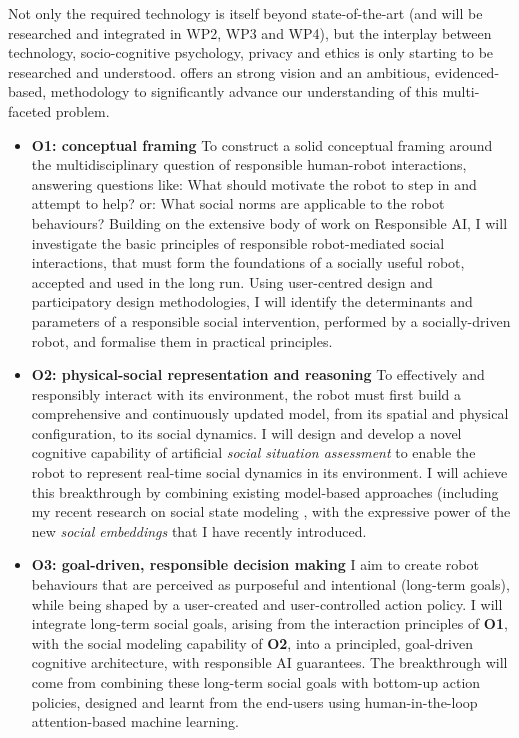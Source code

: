 Not only the required technology is itself beyond state-of-the-art (and will be
researched and integrated in WP2, WP3 and WP4), but the
interplay between technology, socio-cognitive psychology, privacy and ethics is
only starting to be researched and understood. \project offers an
strong vision and an ambitious, evidenced-based, methodology to significantly
advance our understanding of this multi-faceted problem.


\begin{itemize}
    \item \textbf{O1: conceptual framing} To construct a solid conceptual
        framing around the multidisciplinary question of responsible human-robot
        interactions, answering questions like: What should motivate the robot
        to step in and attempt to help? or: What social norms are applicable to
        the robot behaviours? Building on the extensive body of work on
        Responsible AI, I will investigate the basic principles of
        responsible robot-mediated social interactions, that must form the
        foundations of a socially useful robot, accepted and used in the long
        run.  Using user-centred design and participatory design methodologies,
        I will identify the determinants and parameters of a responsible social
        intervention, performed by a socially-driven robot, and formalise them
        in practical principles.

    \item \textbf{O2: physical-social representation and reasoning} To
        effectively and responsibly interact with its environment, the robot
        must first build a comprehensive and continuously updated model, from its
        spatial and physical configuration, to its social dynamics. I will
        design and develop a novel cognitive capability of artificial
        \emph{social situation assessment} to enable the robot to represent
        real-time social dynamics in its environment. I will achieve this
        breakthrough by combining existing model-based approaches 
        (including my recent research on social state modeling , with
        the expressive power of the new \emph{social embeddings} that I have
        recently introduced.

    \item {\bf O3: goal-driven, responsible decision making} I aim to create
        robot behaviours that are perceived as purposeful and intentional
        (long-term goals), while being shaped by a user-created and
        user-controlled action policy.  I will integrate long-term social goals,
        arising from the interaction principles of \textbf{O1}, with the social
        modeling capability of \textbf{O2}, into a principled, goal-driven
        cognitive architecture, with responsible AI guarantees. The breakthrough
        will come from combining these long-term social goals with bottom-up
        action policies, designed and learnt from the end-users using
        human-in-the-loop attention-based machine learning.


\end{itemize}

